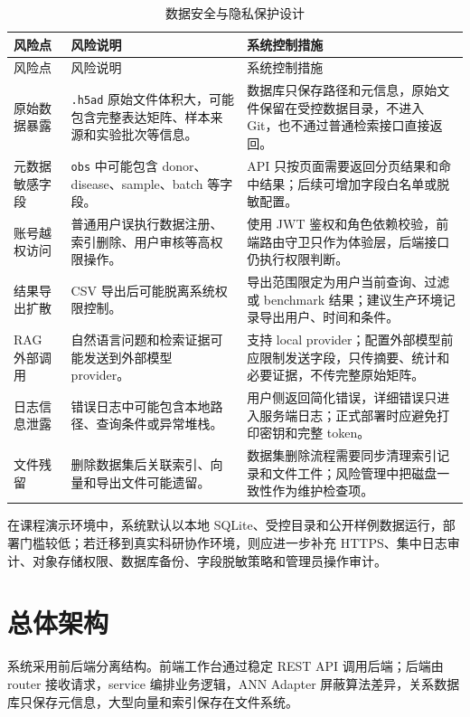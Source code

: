 \documentclass[UTF8,a4paper,12pt]{ctexrep}
\begin{document}
\begin{longtable}{@{}L{0.18\textwidth}L{0.34\textwidth}L{0.38\textwidth}@{}}
  \caption{数据安全与隐私保护设计} \\
  \toprule
  风险点 & 风险说明 & 系统控制措施 \\
  \midrule
  \endfirsthead
  \toprule
  风险点 & 风险说明 & 系统控制措施 \\
  \midrule
  \endhead
  原始数据暴露 & \texttt{.h5ad} 原始文件体积大，可能包含完整表达矩阵、样本来源和实验批次等信息。 & 数据库只保存路径和元信息，原始文件保留在受控数据目录，不进入 Git，也不通过普通检索接口直接返回。 \\
  元数据敏感字段 & \texttt{obs} 中可能包含 donor、disease、sample、batch 等字段。 & API 只按页面需要返回分页结果和命中结果；后续可增加字段白名单或脱敏配置。 \\
  账号越权访问 & 普通用户误执行数据注册、索引删除、用户审核等高权限操作。 & 使用 JWT 鉴权和角色依赖校验，前端路由守卫只作为体验层，后端接口仍执行权限判断。 \\
  结果导出扩散 & CSV 导出后可能脱离系统权限控制。 & 导出范围限定为用户当前查询、过滤或 benchmark 结果；建议生产环境记录导出用户、时间和条件。 \\
  RAG 外部调用 & 自然语言问题和检索证据可能发送到外部模型 provider。 & 支持 local provider；配置外部模型前应限制发送字段，只传摘要、统计和必要证据，不传完整原始矩阵。 \\
  日志信息泄露 & 错误日志中可能包含本地路径、查询条件或异常堆栈。 & 用户侧返回简化错误，详细错误只进入服务端日志；正式部署时应避免打印密钥和完整 token。 \\
  文件残留 & 删除数据集后关联索引、向量和导出文件可能遗留。 & 数据集删除流程需要同步清理索引记录和文件工件；风险管理中把磁盘一致性作为维护检查项。 \\
  \bottomrule
\end{longtable}

在课程演示环境中，系统默认以本地 SQLite、受控目录和公开样例数据运行，部署门槛较低；若迁移到真实科研协作环境，则应进一步补充 HTTPS、集中日志审计、对象存储权限、数据库备份、字段脱敏策略和管理员操作审计。

\section{总体架构}

系统采用前后端分离结构。前端工作台通过稳定 REST API 调用后端；后端由 router 接收请求，service 编排业务逻辑，ANN Adapter 屏蔽算法差异，关系数据库只保存元信息，大型向量和索引保存在文件系统。
\end{document}
